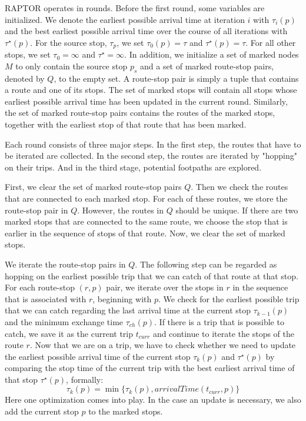RAPTOR operates in rounds.
Before the first round, some variables are initialized.
We denote the earliest possible arrival time at iteration \(i\) with \(\tau_i(p)\) and the best earliest possible arrival time over the course of all iterations with \(\tau^\star(p)\).
For the source stop, \(\tau_p\), we set \(\tau_0(p) =\tau\) and \(\tau^\star(p) = \tau\).
For all other stops, we set \(\tau_0 = \infty\) and \(\tau^\star = \infty\).
In addition, we initialize a set of marked nodes \(M\) to only contain the source stop \(p_s\) and a set of marked route-stop pairs, denoted by \(Q\), to the empty set.
A route-stop pair is simply a tuple that contains a route and one of its stops.
The set of marked stops will contain all stops whose earliest possible arrival time has been updated in the current round.
Similarly, the set of marked route-stop pairs contains the routes of the marked stops, together with the earliest stop of that route that has been marked.


Each round consists of three major steps.
In the first step, the routes that have to be iterated are collected.
In the second step, the routes are iterated by "hopping" on their trips.
And in the third stage, potential footpaths are explored.

First, we clear the set of marked route-stop pairs \(Q\).
Then we check the routes that are connected to each marked stop.
For each of these routes, we store the route-stop pair in \(Q\).
However, the routes in \(Q\) should be unique.
If there are two marked stops that are connected to the same route, we choose the stop that is earlier in the sequence of stops of that route.
Now, we clear the set of marked stops.

We iterate the route-stop pairs in \(Q\).
The following step can be regarded as hopping on the earliest possible trip that we can catch of that route at that stop.
For each route-stop \((r,p)\) pair, we iterate over the stops in \(r\) in the sequence that is associated with \(r\), beginning with \(p\).
We check for the earliest possible trip that we can catch regarding the last arrival time at the current stop \(\tau_{k-1}(p)\) and the minimum exchange time \(\tau_{ch}(p)\).
If there is a trip that is possible to catch, we save it as the current trip \(t_{curr}\) and continue to iterate the stops of the route \(r\).
Now that we are on a trip, we have to check whether we need to update the earliest possible arrival time of the current stop \(\tau_k(p)\) and \(\tau^\star(p)\) by comparing the stop time of the current trip with the best earliest arrival time of that stop \(\tau^\star(p)\), formally:
\[\tau_k(p) = \min\{\tau_k(p), arrivalTime(t_{curr}, p)\}\]
Here one optimization comes into play.
In the case an update is necessary, we also add the current stop \(p\) to the marked stops.

